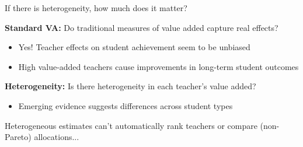 \documentclass[t,aspectratio=169,11pt]{beamer}
\begin{document}
\begin{frame}{If there is heterogeneity, how much does it matter?}

    \vfill
    \begin{wideitemize}
        \item \textbf{Standard VA:} Do traditional measures of value added capture real effects?
            \begin{itemize}
                \item<2-> Yes! Teacher effects on student achievement seem to be unbiased
                
                {\tiny \color{gray}\citep[e.g.,][etc.]{chetty2014measuring1,Koedel2015}}
                
                \item<3-> High value-added teachers cause improvements in long-term student outcomes
                
                {\tiny \color{gray}\citep[e.g.,][]{chetty2014measuring2,pope2017multidimensional}}
            \end{itemize}
        
        \item<4-> \textbf{Heterogeneity:} Is there heterogeneity in each teacher's value added?
            \begin{itemize}
                \item<5-> Emerging evidence suggests differences across student types
            
                {\tiny \color{gray} \citep[e.g.,][]{lockwood2009,condie2014teacher,pope2017multidimensional,Delgado2020,bates2022teacher}}
            \end{itemize}
            
        \item<6-> Heterogeneous estimates can't automatically rank teachers or compare (non-Pareto) allocations... 
    \end{wideitemize}
    \vfill
    
\end{frame}


\end{document}
